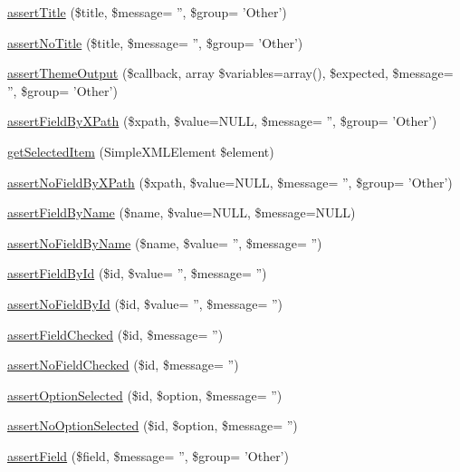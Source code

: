 \begin{DoxyCompactItemize}
\item 
\hyperlink{classDrupalWebTestCase_a4bb17839035399f3c73befdd4bd0da5b}{assertTitle} (\$title, \$message= '', \$group= 'Other')
\item 
\hyperlink{classDrupalWebTestCase_a629c2539df1b0958feb18b9bc83eb0fa}{assertNoTitle} (\$title, \$message= '', \$group= 'Other')
\item 
\hyperlink{classDrupalWebTestCase_af6ae7851b6b79b5ec0169eb7b67ad518}{assertThemeOutput} (\$callback, array \$variables=array(), \$expected, \$message= '', \$group= 'Other')
\item 
\hyperlink{classDrupalWebTestCase_a870dded2b4059ee7e6827dad6d4bf650}{assertFieldByXPath} (\$xpath, \$value=NULL, \$message= '', \$group= 'Other')
\item 
\hyperlink{classDrupalWebTestCase_a4f24b7eddfb7d495f4ad8592f0b24929}{getSelectedItem} (SimpleXMLElement \$element)
\item 
\hyperlink{classDrupalWebTestCase_a6e63d3934a6804ea09b0148acd849be0}{assertNoFieldByXPath} (\$xpath, \$value=NULL, \$message= '', \$group= 'Other')
\item 
\hyperlink{classDrupalWebTestCase_a7d75feaa5c363f5b346dfcff53f226b5}{assertFieldByName} (\$name, \$value=NULL, \$message=NULL)
\item 
\hyperlink{classDrupalWebTestCase_a323f24e8b6dcf37ae100ad7102ee85db}{assertNoFieldByName} (\$name, \$value= '', \$message= '')
\item 
\hyperlink{classDrupalWebTestCase_ad3779958ca911e96582177f110278111}{assertFieldById} (\$id, \$value= '', \$message= '')
\item 
\hyperlink{classDrupalWebTestCase_adbaec19474181965ddd70c6ee273d113}{assertNoFieldById} (\$id, \$value= '', \$message= '')
\item 
\hyperlink{classDrupalWebTestCase_aea0ec61d9b9f476c5b23cb0111bda4b7}{assertFieldChecked} (\$id, \$message= '')
\item 
\hyperlink{classDrupalWebTestCase_a23fbbe9b681b00419a0023ef07b48067}{assertNoFieldChecked} (\$id, \$message= '')
\item 
\hyperlink{classDrupalWebTestCase_a95c2f2a414be5f4f52688c0549ef60ec}{assertOptionSelected} (\$id, \$option, \$message= '')
\item 
\hyperlink{classDrupalWebTestCase_acb8121ae5a53f0aee3228f5cc48e8265}{assertNoOptionSelected} (\$id, \$option, \$message= '')
\item 
\hyperlink{classDrupalWebTestCase_a3955b3b90e4688bbd6f8fa0c5b47bfbe}{assertField} (\$field, \$message= '', \$group= 'Other')

\end{DoxyCompactItemize}
